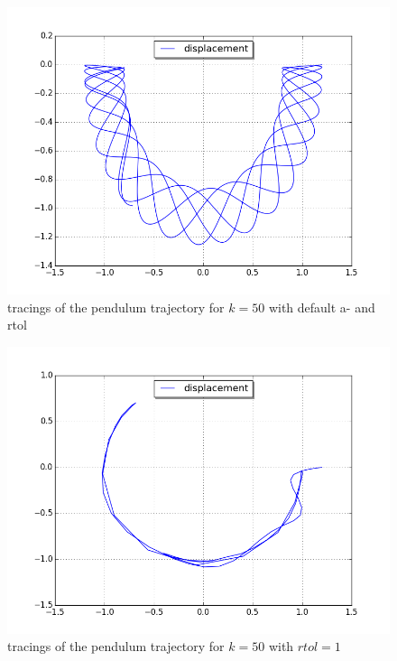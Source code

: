 \documentclass[a4paper,11pt]{article}
\theoremstyle{mytheor}
\begin{document}
\begin{figure}[!h]
\centering
\includegraphics[scale=0.5]{task1_k50_utdrag12_default.png}
\caption{tracings of the pendulum trajectory for $k = 50$ with default a- and rtol}
\label{3k10at01}
\end{figure}

\begin{figure}[!h]
\centering
\includegraphics[scale=0.5]{task1_k50_utdrag12_atol01.png}
\caption{tracings of the pendulum trajectory for $k = 50$ with $rtol = 1$}
\label{3k10rt01}
\end{figure}
\end{document}

